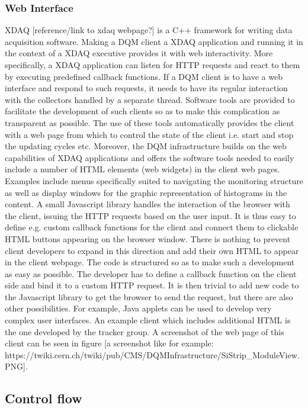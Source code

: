 \documentclass[a4paper]{cmspaper}
\begin{document}
\subsubsection{Web Interface}
XDAQ [reference/link to xdaq webpage?] is a C++ framework for writing data acquisition software. Making a DQM client a XDAQ application and running it in the context of a XDAQ executive provides it with web interactivity. More specifically, a XDAQ application can listen for HTTP requests and react to them by executing predefined callback functions. If a DQM client is to have a web interface and respond to such requests, it needs to have its regular interaction with the collectors handled by a separate thread. Software tools are provided to facilitate the development of such clients so as to make this complication as transparent as possible. The use of these tools automatically provides the client with a web page from which to control the state of the client i.e. start and stop the updating cycles etc.
%
Moreover, the DQM infrastructure builds on the web capabilities of XDAQ applications and offers the software tools needed to easily include a number of HTML elements (web widgets) in the client web pages. Examples include menus specifically suited to navigating the monitoring structure as well as display windows for the graphic representation of histograms in the content. A small Javascript library handles the interaction of the browser with the client, issuing the HTTP requests based on the user input. It is thus easy to define e.g. custom callback functions for the client and connect them to clickable HTML buttons appearing on the browser window. 
%
There is nothing to prevent client developers to expand in this direction and add their own HTML to appear in the client webpage. The code is structured so as to make such a development as easy as possible. The developer has to define a callback function on the client side and bind it to a custom HTTP request. It is then trivial to add new code to the Javascript library to get the browser to send the request, but there are also other possibilities. For example, Java applets can be used to develop very complex user interfaces. An example client which includes additional HTML is the one developed by the tracker group. A screenshot of the web page of this client can be seen in figure [a screenshot like for example: https://twiki.cern.ch/twiki/pub/CMS/DQMInfrastructure/SiStrip\_ModuleView.PNG].

\subsection{Control flow}
\end{document}
